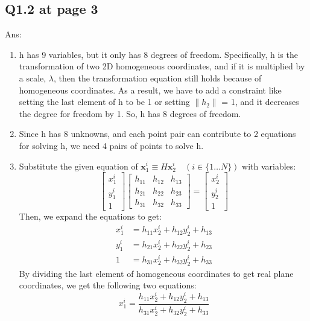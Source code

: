 \documentclass[12pt]{article}
\begin{document}
	\subsection*{Q1.2 at page 3}
	Ans:\\
	\begin{enumerate}
		\item h has 9 variables, but it only has 8 degrees of freedom. Specifically, h is the transformation of two 2D homogeneous coordinates, and if it is multiplied by a scale, $\lambda$, then the transformation equation still holds because of homogeneous coordinates. As a result, we have to add a constraint like setting the last element of h to be 1 or setting $\|h_2\|$ = 1, and it decreases the degree for freedom by 1. So, h has 8 degrees of freedom.
		 
		\item Since h has 8 unknowns, and each point pair can contribute to 2 equations for solving h, we need 4 pairs of points to solve h.
    	\item Substitute the given equation of $\mathbf{x}_1^i \equiv H \mathbf{x}_2^i \quad (i \in \{1 \dots N\})$ with variables:\\
		\[
			\begin{bmatrix}
				x^i_1 \\
				y^i_1 \\
				1
			\end{bmatrix}
			\begin{bmatrix}
			h_{11} & h_{12} & h_{13} \\
			h_{21} & h_{22} & h_{23} \\
			h_{31} & h_{32} & h_{33}
			\end{bmatrix}
			=
			\begin{bmatrix}
				x^i_2 \\
				y^i_2 \\
				1
			\end{bmatrix}
		\]
		Then, we expand the equations to get:\\
		\begin{align*}
			x_1^i &= h_{11} x_2^i + h_{12} y_2^i + h_{13} \\
			y_1^i &= h_{21} x_2^i + h_{22} y_2^i + h_{23} \\
			1 &= h_{31} x_2^i + h_{32} y_2^i + h_{33}
		\end{align*}
		By dividing the last element of homogeneous coordinates to get real plane coordinates, we get the following two equations:
		\[
			x^i_1 = \frac{h_{11}x^i_2 + h_{12}y^i_2 + h_{13}}{h_{31}x^i_2 + h_{32}y^i_2 + h_{33}}
\]
\end{enumerate}
\end{document}
